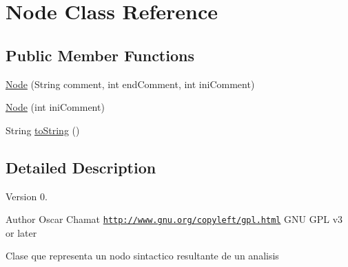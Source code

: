 \hypertarget{classNode}{\section{Node Class Reference}
\label{classNode}
}
\subsection*{Public Member Functions}
\begin{DoxyCompactItemize}
\item 
\hyperlink{classNode_ac49d7bf2c7bab18b91c6c63fddfc5cb8}{Node} (String comment, int end\-Comment, int ini\-Comment)
\item 
\hyperlink{classNode_a36a5d1725e0943c7fbfe584ed4bd870d}{Node} (int ini\-Comment)
\item 
String \hyperlink{classNode_a5178447ba3e6a582f72c3b8bc217a78e}{to\-String} ()
\end{DoxyCompactItemize}


\subsection{Detailed Description}
\begin{DoxyVersion}{Version}
0. 
\end{DoxyVersion}
\begin{DoxyAuthor}{Author}
Oscar Chamat  \href{http://www.gnu.org/copyleft/gpl.html}{\tt http\-://www.\-gnu.\-org/copyleft/gpl.\-html} G\-N\-U G\-P\-L v3 or later
\end{DoxyAuthor}
Clase que representa un nodo sintactico resultante de un analisis 

